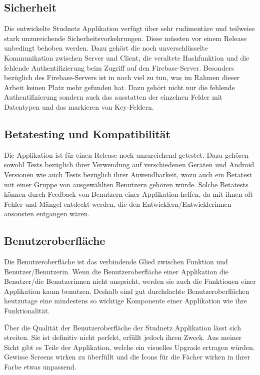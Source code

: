 \documentclass[../main.tex]{subfiles}
\begin{document}
	\subsection*{Sicherheit}
	Die entwickelte Studnetz Applikation verfügt über sehr rudimentäre und teilweise stark unzureichende Sicherheitsvorkehrungen. Diese müssten vor einem Release unbedingt behoben werden. Dazu gehört die noch unverschlüsselte Kommunikation zwischen Server und Client, die veraltete Hashfunktion und die fehlende Authentifizierung beim Zugriff auf den Firebase-Server. Besonders bezüglich des Firebase-Servers ist in noch viel zu tun, was im Rahmen dieser Arbeit keinen Platz mehr gefunden hat. Dazu gehört nicht nur die fehlende Authentifizierung sondern auch das ausstatten der einzelnen Felder mit Datentypen und das markieren von Key-Feldern.
	
	
	\subsection*{Betatesting und Kompatibilität}
	Die Applikation ist für einen Release noch unzureichend getestet. Dazu gehören sowohl Tests bezüglich ihrer Verwendung auf verschiedenen Geräten und Android Versionen wie auch Tests bezüglich ihrer Anwendbarkeit, wozu auch ein Betatest mit einer Gruppe von ausgewählten Benutzern gehören würde. Solche Betatests können durch Feedback von Benutzern einer Applikation helfen, da mit ihnen oft Fehler und Mängel entdeckt werden, die den Entwicklern/Entwicklerinnen ansonsten entgangen wären.
	
	\subsection*{Benutzeroberfläche}
	Die Benutzeroberfläche ist das verbindende Glied zwischen Funktion und Benutzer/Benutzerin. Wenn die Benutzeroberfläche einer Applikation die Benutzer/die Benutzerinnen nicht anspricht, werden sie auch die Funktionen einer Applikation kaum benutzen. Deshalb sind gut durchdachte Benutzeroberflächen heutzutage eine mindestens so wichtige Komponente einer Applikation wie ihre Funktionalität.
	
	Über die Qualität der Benutzeroberfläche der Studnetz Applikation lässt sich streiten. Sie ist definitiv nicht perfekt, erfüllt jedoch ihren Zweck. Aus meiner Sicht gibt es Teile der Applikation, welche ein visuelles Upgrade ertragen würden. Gewisse Screens wirken zu überfüllt und die Icons für die Fächer wirken in ihrer Farbe etwas unpassend.
	
\end{document}
